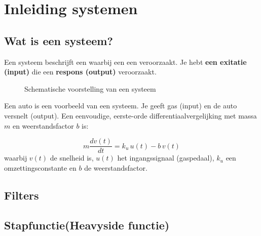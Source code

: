 \chapter{Inleiding systemen}
\label{ch:Inleiding systemen}

\section{Wat is een systeem?}

\begin{conceptbox}
    
Een systeem beschrijft een  waarbij een  een  veroorzaakt.
Je hebt \textbf{een exitatie (input)} die een \textbf{respons (output)} veroorzaakt.
\end{conceptbox}

\begin{figure}[htbp]
    \centering
    \caption{Schematische voorstelling van een systeem}
    \label{fig:systeem_diagram}
\end{figure}

Een auto is een voorbeeld van een systeem.
Je geeft gas (input) en de auto versnelt (output). 
Een eenvoudige, eerste-orde differentiaalvergelijking met massa $m$ en weerstandsfactor $b$ is:

\begin{equation}
    m\frac{dv(t)}{dt} = k_u\,u(t) - b\,v(t)
\end{equation}
waarbij $v(t)$ de snelheid is, $u(t)$ het ingangssignaal (gaspedaal), 
$k_u$ een omzettingsconstante en $b$ de weerstandsfactor. 

\section{Filters}

\section{Stapfunctie(Heavyside functie)}

